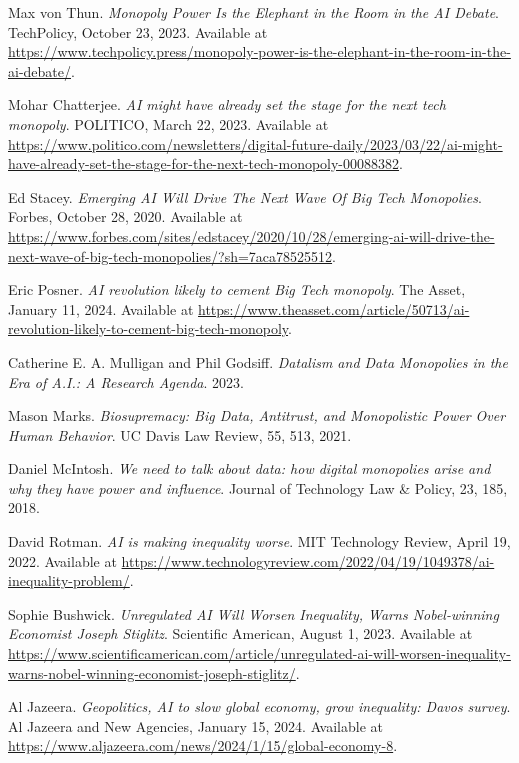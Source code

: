 \documentclass[11pt]{article}
\begin{document}
\begin{thebibliography}{12}

Max von Thun.
\textit{Monopoly Power Is the Elephant in the Room in the AI Debate}.
TechPolicy, October 23, 2023.
Available at \url{https://www.techpolicy.press/monopoly-power-is-the-elephant-in-the-room-in-the-ai-debate/}.

Mohar Chatterjee.
\textit{AI might have already set the stage for the next tech monopoly}.
POLITICO, March 22, 2023.
Available at \url{https://www.politico.com/newsletters/digital-future-daily/2023/03/22/ai-might-have-already-set-the-stage-for-the-next-tech-monopoly-00088382}.

Ed Stacey.
\textit{Emerging AI Will Drive The Next Wave Of Big Tech Monopolies}.
Forbes, October 28, 2020.
Available at \url{https://www.forbes.com/sites/edstacey/2020/10/28/emerging-ai-will-drive-the-next-wave-of-big-tech-monopolies/?sh=7aca78525512}.

Eric Posner.
\textit{AI revolution likely to cement Big Tech monopoly}.
The Asset, January 11, 2024.
Available at \url{https://www.theasset.com/article/50713/ai-revolution-likely-to-cement-big-tech-monopoly}.

Catherine E. A. Mulligan and Phil Godsiff.
\textit{Datalism and Data Monopolies in the Era of A.I.: A Research Agenda}.
2023.

Mason Marks.
\textit{Biosupremacy: Big Data, Antitrust, and Monopolistic Power Over Human Behavior}.
UC Davis Law Review, 55, 513, 2021.

Daniel McIntosh.
\textit{We need to talk about data: how digital monopolies arise and why they have power and influence}.
Journal of Technology Law \& Policy, 23, 185, 2018.

David Rotman.
\textit{AI is making inequality worse}.
MIT Technology Review, April 19, 2022.
Available at \url{https://www.technologyreview.com/2022/04/19/1049378/ai-inequality-problem/}.

Sophie Bushwick.
\textit{Unregulated AI Will Worsen Inequality, Warns Nobel-winning Economist Joseph Stiglitz}.
Scientific American, August 1, 2023.
Available at \url{https://www.scientificamerican.com/article/unregulated-ai-will-worsen-inequality-warns-nobel-winning-economist-joseph-stiglitz/}.

Al Jazeera.
\textit{Geopolitics, AI to slow global economy, grow inequality: Davos survey}.
Al Jazeera and New Agencies, January 15, 2024.
Available at \url{https://www.aljazeera.com/news/2024/1/15/global-economy-8}.


\end{thebibliography}
\end{document}
